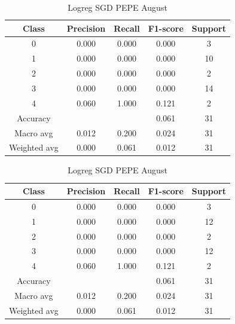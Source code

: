 \begin{enumerate}
\begin{enumerate}
                \begin{table}[H]
                \centering
                \scriptsize
                \begin{minipage}{0.48\textwidth}
                \centering
                \begin{tabular}{c|cccc}
                \hline
                Class & Precision & Recall & F1-score & Support \\
                \hline
                0 & 0.000 & 0.000 & 0.000 & 3 \\
                1 & 0.000 & 0.000 & 0.000 & 10 \\
                2 & 0.000 & 0.000 & 0.000 & 2 \\
                3 & 0.000 & 0.000 & 0.000 & 14 \\
                4 & 0.060 & 1.000 & 0.121 & 2 \\
                \hline
                Accuracy &       &      & 0.061 & 31 \\
                Macro avg & 0.012 & 0.200 & 0.024 & 31 \\
                Weighted avg & 0.000 & 0.061 & 0.012 & 31 \\
                \hline
                \end{tabular}
                \caption{Logreg SGD DOGE August}
                \label{tab:classifier_2_report_logreg_sgd_doge_non_filtered_aug}
                \end{minipage}%
                \hfill
                \begin{minipage}{0.48\textwidth}
                \centering
                \begin{tabular}{c|cccc}
                \hline
                Class & Precision & Recall & F1-score & Support \\
                \hline
                0 & 0.000 & 0.000 & 0.000 & 3 \\
                1 & 0.000 & 0.000 & 0.000 & 12 \\
                2 & 0.000 & 0.000 & 0.000 & 2 \\
                3 & 0.000 & 0.000 & 0.000 & 12 \\
                4 & 0.060 & 1.000 & 0.121 & 2 \\
                \hline
                Accuracy &       &      & 0.061 & 31 \\
                Macro avg & 0.012 & 0.200 & 0.024 & 31 \\
                Weighted avg & 0.000 & 0.061 & 0.012 & 31 \\
                \hline
                \end{tabular}
                \caption{Logreg SGD PEPE August}
                \label{tab:classifier_2_report_logreg_sgd_pepe_non_filtered_aug}
                \end{minipage}
                

\end{table}
\end{enumerate}
\end{enumerate}
